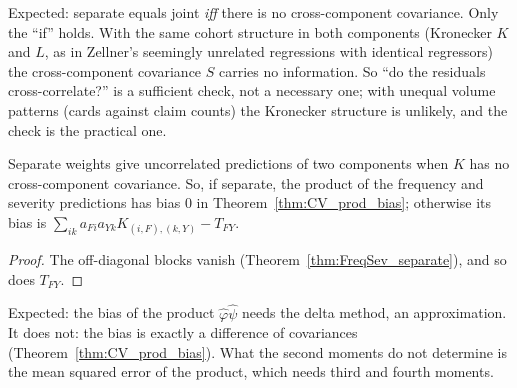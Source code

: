 \begin{remark}[Finding 32]
  Expected: separate equals joint \emph{iff} there is no cross-component covariance. Only the
  ``if'' holds. With the same cohort structure in both components (Kronecker $K$ and $L$, as
  in Zellner's seemingly unrelated regressions with identical regressors) the cross-component
  covariance $S$ carries no information. So ``do the residuals cross-correlate?'' is a
  sufficient check, not a necessary one; with unequal volume patterns (cards against claim
  counts) the Kronecker structure is unlikely, and the check is the practical one.
\end{remark}

\begin{corollary}\label{cor:FreqSev_prod}
  \leanok
  Separate weights give uncorrelated predictions of two components when $K$ has no
  cross-component covariance. So, if separate, the product of the frequency and severity
  predictions has bias $0$ in Theorem~\ref{thm:CV_prod_bias}; otherwise its bias is
  $\sum_{ik} a_{Fi}a_{Yk}K_{(i,F),(k,Y)} - T_{FY}$.
\end{corollary}
\begin{proof}
  \leanok
  The off-diagonal blocks vanish (Theorem~\ref{thm:FreqSev_separate}), and so does $T_{FY}$.
\end{proof}

\begin{remark}[Finding 33]
  Expected: the bias of the product $\hat\varphi\hat\psi$ needs the delta method, an
  approximation. It does not: the bias is exactly a difference of covariances
  (Theorem~\ref{thm:CV_prod_bias}). What the second moments do not determine is the mean
  squared error of the product, which needs third and fourth moments.
\end{remark}
